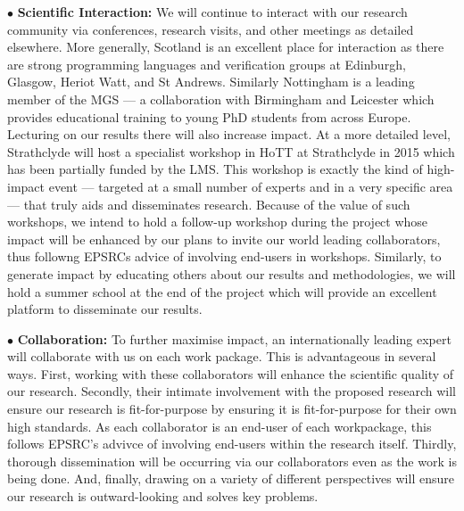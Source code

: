 \documentclass[a4paper,11pt]{article}
\begin{document}
\vspace*{0.02in} $\bullet$ {\bf Scientific Interaction:} We will
continue to interact with our research community via conferences,
research visits, and other meetings as detailed elsewhere. More
generally, Scotland is an excellent place for interaction as there are
strong programming languages and verification groups at Edinburgh,
Glasgow, Heriot Watt, and St Andrews. Similarly Nottingham is a
leading member of the MGS --- a collaboration with Birmingham and
Leicester which provides educational training to young PhD students
from across Europe. Lecturing on our results there will also increase
impact. At a more detailed level, Strathclyde will host a specialist
workshop in HoTT at Strathclyde in 2015 which has been partially
funded by the LMS. This workshop is exactly the kind of high-impact
event --- targeted at a small number of experts and in a very specific
area --- that truly aids and disseminates research. Because of the
value of such workshops, we intend to hold a follow-up workshop during
the project whose impact will be enhanced by our plans to invite our
world leading collaborators, thus followng EPSRCs advice of involving
end-users in workshops. Similarly, to generate impact by educating
others about our results and methodologies, we will hold a summer
school at the end of the project which will provide an excellent
platform to disseminate our results.

\vspace*{0.02in}

$\bullet$ {\bf Collaboration:} To further maximise impact, an
internationally leading expert will collaborate with us on each work
package.  This is advantageous in several ways. First, working with
these collaborators will enhance the scientific quality of our
research. Secondly, their intimate involvement with the proposed
research will ensure our research is fit-for-purpose by ensuring it is
fit-for-purpose for their own high standards. As each collaborator is
an end-user of each workpackage, this follows EPSRC's advivce of
involving end-users within the research itself. Thirdly, thorough
dissemination will be occurring via our collaborators even as the work
is being done. And, finally, drawing on a variety of different
perspectives will ensure our research is outward-looking and solves
key problems.
\end{document}
